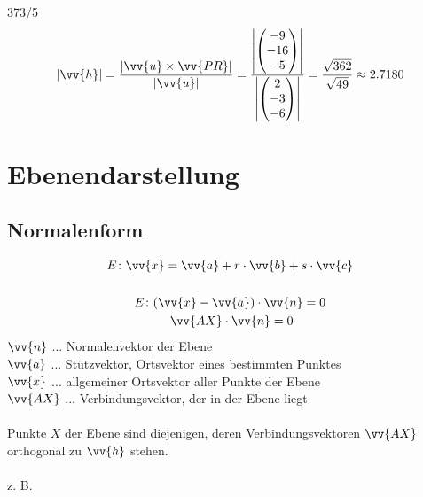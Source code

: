 \begin{exercise}{373/5}
\begin{gather*}
    |\vv{h}| = \frac{|\vv{u} \times \vv{PR}|}{|\vv{u}|} = \frac{\left|\begin{pmatrix}-9 \\ -16 \\ -5\end{pmatrix}\right|}{\left|\begin{pmatrix}2 \\ -3 \\ -6\end{pmatrix}\right|} = \frac{\sqrt{362}}{\sqrt{49}} \approx 2.7180
  \end{gather*}
\end{exercise}
\section{Ebenendarstellung}
\subsection{Normalenform}
\begin{gather*}
  E \colon \vv{x} = \vv{a} + r \cdot \vv{b} + s \cdot \vv{c} \\\\
  E \colon (\vv{x} - \vv{a}) \cdot \vv{n} = 0 \\
  \; \vv{AX} \cdot \vv{n} = 0
\end{gather*}
$\vv{n}$ ... Normalenvektor der Ebene \\
$\vv{a}$ ... Stützvektor, Ortsvektor eines bestimmten Punktes \\
$\vv{x}$ ... allgemeiner Ortsvektor aller Punkte der Ebene \\
$\vv{AX}$ ... Verbindungsvektor, der in der Ebene liegt \\\\
Punkte $X$ der Ebene sind diejenigen, deren Verbindungsvektoren $\vv{AX}$ orthogonal zu $\vv{h}$ stehen. \\\\
z. B.
